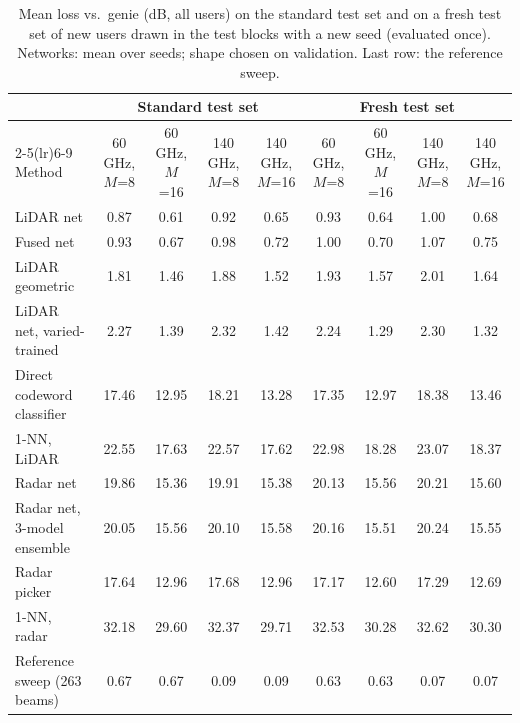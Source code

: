 \begin{table}[t]\centering\caption{Mean loss vs.\ genie (dB, all users) on the standard test set and on a fresh test set of new users drawn in the test blocks with a new seed (evaluated once). Networks: mean over seeds; shape chosen on validation. Last row: the reference sweep.}\label{tab:baselines}
\small\begin{tabular}{@{}lcccccccc@{}}\toprule
 & \multicolumn{4}{c}{Standard test set} & \multicolumn{4}{c}{Fresh test set} \\
\cmidrule(lr){2-5}\cmidrule(lr){6-9}
Method & 60 GHz, $M$=8 & 60 GHz, $M$=16 & 140 GHz, $M$=8 & 140 GHz, $M$=16 & 60 GHz, $M$=8 & 60 GHz, $M$=16 & 140 GHz, $M$=8 & 140 GHz, $M$=16 \\\midrule
LiDAR net & 0.87 & 0.61 & 0.92 & 0.65 & 0.93 & 0.64 & 1.00 & 0.68 \\
Fused net & 0.93 & 0.67 & 0.98 & 0.72 & 1.00 & 0.70 & 1.07 & 0.75 \\
LiDAR geometric & 1.81 & 1.46 & 1.88 & 1.52 & 1.93 & 1.57 & 2.01 & 1.64 \\
LiDAR net, varied-trained & 2.27 & 1.39 & 2.32 & 1.42 & 2.24 & 1.29 & 2.30 & 1.32 \\
Direct codeword classifier & 17.46 & 12.95 & 18.21 & 13.28 & 17.35 & 12.97 & 18.38 & 13.46 \\
1-NN, LiDAR & 22.55 & 17.63 & 22.57 & 17.62 & 22.98 & 18.28 & 23.07 & 18.37 \\
Radar net & 19.86 & 15.36 & 19.91 & 15.38 & 20.13 & 15.56 & 20.21 & 15.60 \\
Radar net, 3-model ensemble & 20.05 & 15.56 & 20.10 & 15.58 & 20.16 & 15.51 & 20.24 & 15.55 \\
Radar picker & 17.64 & 12.96 & 17.68 & 12.96 & 17.17 & 12.60 & 17.29 & 12.69 \\
1-NN, radar & 32.18 & 29.60 & 32.37 & 29.71 & 32.53 & 30.28 & 32.62 & 30.30 \\
Reference sweep (263 beams) & 0.67 & 0.67 & 0.09 & 0.09 & 0.63 & 0.63 & 0.07 & 0.07 \\
\bottomrule\end{tabular}\end{table}
